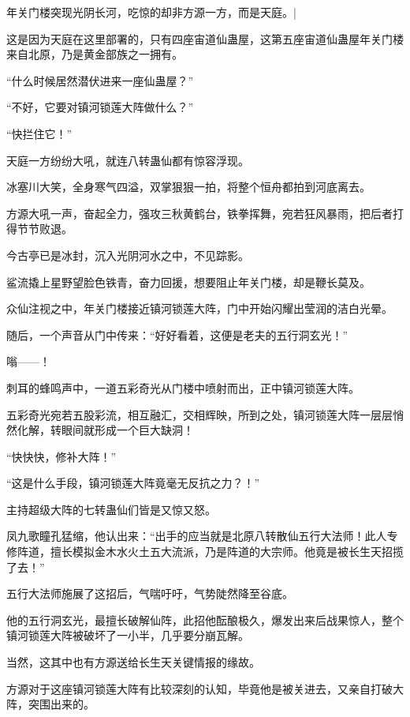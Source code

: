 
\begin{this_body}



年关门楼突现光阴长河，吃惊的却非方源一方，而是天庭。|

这是因为天庭在这里部署的，只有四座宙道仙蛊屋，这第五座宙道仙蛊屋年关门楼来自北原，乃是黄金部族之一拥有。

“什么时候居然潜伏进来一座仙蛊屋？”

“不好，它要对镇河锁莲大阵做什么？”

“快拦住它！”

天庭一方纷纷大吼，就连八转蛊仙都有惊容浮现。

冰塞川大笑，全身寒气四溢，双掌狠狠一拍，将整个恒舟都拍到河底离去。

方源大吼一声，奋起全力，强攻三秋黄鹤台，铁拳挥舞，宛若狂风暴雨，把后者打得节节败退。

今古亭已是冰封，沉入光阴河水之中，不见踪影。

鲨流撬上星野望脸色铁青，奋力回援，想要阻止年关门楼，却是鞭长莫及。

众仙注视之中，年关门楼接近镇河锁莲大阵，门中开始闪耀出莹润的洁白光晕。

随后，一个声音从门中传来：“好好看着，这便是老夫的五行洞玄光！”

嗡——！

刺耳的蜂鸣声中，一道五彩奇光从门楼中喷射而出，正中镇河锁莲大阵。

五彩奇光宛若五股彩流，相互融汇，交相辉映，所到之处，镇河锁莲大阵一层层悄然化解，转眼间就形成一个巨大缺洞！

“快快快，修补大阵！”

“这是什么手段，镇河锁莲大阵竟毫无反抗之力？！”

主持超级大阵的七转蛊仙们皆是又惊又怒。

凤九歌瞳孔猛缩，他认出来：“出手的应当就是北原八转散仙五行大法师！此人专修阵道，擅长模拟金木水火土五大流派，乃是阵道的大宗师。他竟是被长生天招揽了去！”

五行大法师施展了这招后，气喘吁吁，气势陡然降至谷底。

他的五行洞玄光，最擅长破解仙阵，此招他酝酿极久，爆发出来后战果惊人，整个镇河锁莲大阵被破坏了一小半，几乎要分崩瓦解。

当然，这其中也有方源送给长生天关键情报的缘故。

方源对于这座镇河锁莲大阵有比较深刻的认知，毕竟他是被关进去，又亲自打破大阵，突围出来的。


\end{this_body}
